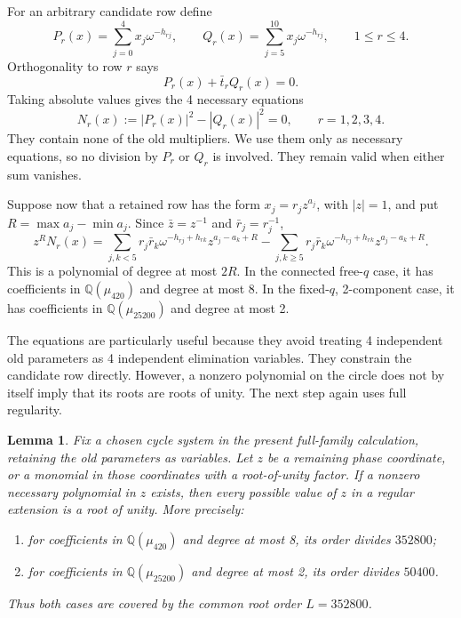 \documentclass[11pt,a4paper]{article}
\newtheorem{lemma}[theorem]{Lemma}
\theoremstyle{plain}
\theoremstyle{definition}
\theoremstyle{plain}
\begin{document}
\medskip
For an arbitrary candidate row define
\[
P_r(x)=\sum_{j=0}^4x_j\omega^{-h_{rj}},\qquad
Q_r(x)=\sum_{j=5}^{10}x_j\omega^{-h_{rj}},\qquad 1\leq r\leq4.
\]
Orthogonality to row $r$ says
$$P_r(x)+\bar t_rQ_r(x)=0.$$
Taking absolute values gives the 4 necessary equations
\[
N_r(x):=|P_r(x)|^2-|Q_r(x)|^2=0,\qquad r=1,2,3,4.
\]
They contain none of the old multipliers. We use them only as necessary equations, so no division by $P_r$ or $Q_r$ is involved. They remain valid when either sum vanishes.

Suppose now that a retained row has the form $x_j=r_jz^{a_j}$, with $|z|=1$, and put $R=\max a_j-\min a_j$. Since $\bar z=z^{-1}$ and $\bar r_j=r_j^{-1}$,
\[
z^RN_r(x)=
\sum_{j,k<5}r_j\bar r_k\omega^{-h_{rj}+h_{rk}}z^{a_j-a_k+R}
-
\sum_{j,k\geq5}r_j\bar r_k\omega^{-h_{rj}+h_{rk}}z^{a_j-a_k+R}.
\]
This is a polynomial of degree at most $2R$. In the connected free-$q$ case, it has coefficients in $\mathbb Q(\mu_{420})$ and degree at most 8. In the fixed-$q$, 2-component case, it has coefficients in $\mathbb Q(\mu_{25200})$ and degree at most 2.

The equations are particularly useful because they avoid treating 4 independent old parameters as 4 independent elimination variables. They constrain the candidate row directly. However, a nonzero polynomial on the circle does not by itself imply that its roots are roots of unity. The next step again uses full regularity.

\par\addvspace{\medskipamount}\noindent
\begin{minipage}{\linewidth}
\begin{lemma}\label{n11_full:torsion}
Fix a chosen cycle system in the present full-family calculation, retaining the old parameters as variables. Let $z$ be a remaining phase coordinate, or a monomial in those coordinates with a root-of-unity factor. If a nonzero necessary polynomial in $z$ exists, then every possible value of $z$ in a regular extension is a root of unity. More precisely:
\begin{enumerate}
\item for coefficients in $\mathbb Q(\mu_{420})$ and degree at most 8, its order divides $352800$;
\item for coefficients in $\mathbb Q(\mu_{25200})$ and degree at most 2, its order divides $50400$.
\end{enumerate}
Thus both cases are covered by the common root order $L=352800$.
\end{lemma}
\end{minipage}
\par\addvspace{\medskipamount}
\end{document}
